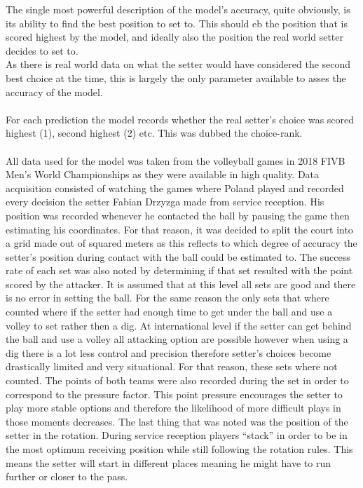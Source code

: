 \documentclass[main.tex]{subfiles}
\begin{document}
        The single most powerful description of the model's accuracy, quite obviously, is its ability to find the best position to set to. This should eb the position that is scored highest by the model, and ideally also the position the real world setter decides to set to.\\
        As there is real world data on what the setter would have considered the second best choice at the time, this is largely the only parameter available to asses the accuracy of the model.
        \\\\
        For each prediction the model records whether the real setter's choice was scored highest (1), second highest (2) etc. This was dubbed the choice-rank.  
        \\\\
        
        
      All data used for the model was taken from the volleyball games in 2018 FIVB Men’s World Championships as they were available in high quality. Data acquisition consisted of watching the games where Poland played and recorded every decision the setter Fabian Drzyzga made from service reception. His position was recorded whenever he contacted the ball by pausing the game then estimating his coordinates.  For that reason, it was decided to split the court into a grid made out of squared meters as this reflects to which degree of accuracy the setter’s position during contact with the ball could be estimated to. The success rate of each set was also noted by determining if that set resulted with the point scored by the attacker. It is assumed that at this level all sets are good and there is no error in setting the ball. For the same reason the only sets that where counted where if the setter had enough time to get under the ball and use a volley to set rather then a dig. At international level if the setter can get behind the ball and use a volley all attacking option are possible however when using a dig there is a lot less control and precision therefore setter’s choices become drastically limited and very situational. For that reason, these sets where not counted. The points of both teams were also recorded during the set in order to correspond to the pressure factor. This point pressure encourages the setter to play more stable options and therefore the likelihood of more difficult plays in those moments decreases. The last thing that was noted was the position of the setter in the rotation. During service reception players “stack” in order to be in the most optimum receiving position while still following the rotation rules. This means the setter will start in different places meaning he might have to run further or closer to the pass.
\end{document}
